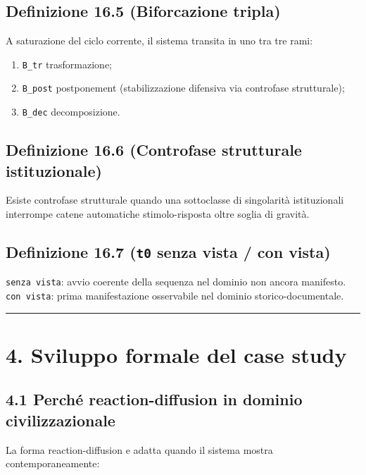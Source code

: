 \subsection{Definizione 16.5 (Biforcazione tripla)}

A saturazione del ciclo corrente, il sistema transita in uno tra tre rami:

\begin{enumerate}
\def\labelenumi{\arabic{enumi}.}
\tightlist
\item
  \texttt{B\_tr} trasformazione;
\item
  \texttt{B\_post} postponement (stabilizzazione difensiva via controfase strutturale);
\item
  \texttt{B\_dec} decomposizione.
\end{enumerate}

\subsection{Definizione 16.6 (Controfase strutturale istituzionale)}

Esiste controfase strutturale quando una sottoclasse di singolarità istituzionali interrompe catene automatiche stimolo-risposta oltre soglia di gravità.

\subsection{\texorpdfstring{Definizione 16.7 (\texttt{t0} senza vista / con vista)}{Definizione 16.7 (t0 senza vista / con vista)}}

\texttt{senza\ vista}: avvio coerente della sequenza nel dominio non ancora manifesto.
\texttt{con\ vista}: prima manifestazione osservabile nel dominio storico-documentale.

\begin{center}\rule{0.5\linewidth}{0.5pt}\end{center}

\section{4. Sviluppo formale del case study}

\subsection{4.1 Perché reaction-diffusion in dominio civilizzazionale}

La forma reaction-diffusion e adatta quando il sistema mostra contemporaneamente:

